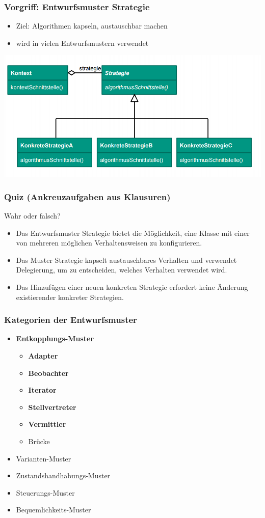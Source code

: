 \documentclass[18pt]{beamer}
\newcommand{\cmark}{\ding{51}}%
\begin{document}
	\begin{frame}
		\frametitle{Vorgriff: Entwurfsmuster Strategie}
		\begin{itemize}
			\item Ziel: Algorithmen kapseln, austauschbar machen
			\item wird in vielen Entwurfsmustern verwendet
		\end{itemize}
		\includegraphics[scale=0.5]{./pics/tut3/strat.png}
	\end{frame}

	\begin{frame}
		\frametitle{Quiz (Ankreuzaufgaben aus Klausuren)}
		Wahr oder falsch?
		\begin{itemize}
			\item Das Entwurfsmuster Strategie bietet die Möglichkeit, eine Klasse mit einer von mehreren möglichen Verhaltensweisen zu konfigurieren. \pause \textcolor{green}{\cmark} \pause
			\item Das Muster Strategie kapselt austauschbares Verhalten und verwendet Delegierung, um zu entscheiden, welches Verhalten verwendet wird. \pause \textcolor{green}{\cmark} \pause 
			\item Das Hinzufügen einer neuen konkreten Strategie erfordert keine Änderung existierender konkreter Strategien. \pause \textcolor{green}{\cmark}
		\end{itemize}
\end{frame}

	\begin{frame}
		\frametitle{Kategorien der Entwurfsmuster}
		\begin{itemize}
			\item \textbf{Entkopplungs-Muster}
				\begin{itemize}
					\item \textbf{Adapter}
					\item \textbf{Beobachter}
					\item \textbf{Iterator}
					\item \textbf{Stellvertreter}
					\item \textbf{Vermittler}
					\item Brücke
				\end{itemize}
			\item Varianten-Muster
			\item Zustandshandhabungs-Muster
			\item Steuerungs-Muster
			\item Bequemlichkeits-Muster
		\end{itemize}
	\end{frame}
\end{document}
